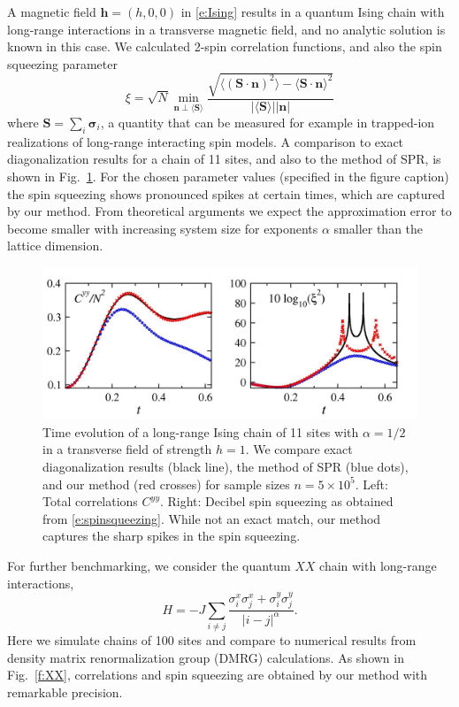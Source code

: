 \documentclass[aps,prl,showpacs,amsmath,amssymb,superscriptaddress,reprint,10pt]{revtex4-1}
\newcommand{\mvec}[1]{\boldsymbol #1}
\begin{document}
A magnetic field $\mvec{h}=(h,0,0)$ in \eqref{e:Ising} results in a quantum Ising chain with long-range interactions in a transverse magnetic field, and no analytic solution is known in this case. We calculated 2-spin correlation functions, and also the spin squeezing parameter
\begin{equation}\label{e:spinsqueezing}
\xi = \sqrt{N}\min_{\mvec{n}\perp\langle\mvec{S}\rangle}\frac{\sqrt{\langle(\mvec{S}\cdot\mvec{n})^2\rangle - \langle\mvec{S}\cdot\mvec{n}\rangle^2}}{|\langle\mvec{S}\rangle||\mvec{n}|}
\end{equation}
where $\mvec{S}=\sum_i \mvec{\sigma}_i$, a quantity that can be measured for example in trapped-ion realizations of long-range interacting spin models. A comparison to exact diagonalization results for a chain of 11 sites, and also to the method of SPR, is shown in Fig.~\ref{f:TFIM}. For the chosen parameter values (specified in the figure caption) the spin squeezing shows pronounced spikes at certain times, which are captured by our method. From theoretical arguments we expect the approximation error to become smaller with increasing system size for exponents $\alpha$ smaller than the lattice dimension. 

\begin{figure}\centering
\includegraphics[width=\linewidth]{./Jz1hx1_Schach_alph05_N11_nt500000.jpg}
\caption{\label{f:TFIM}%
Time evolution of a long-range Ising chain of 11 sites with $\alpha=1/2$ in a transverse field of strength $h=1$. We compare exact diagonalization results (black line), the method of SPR (blue dots), and our method (red crosses) for sample sizes $n=5\times10^5$. Left: Total correlations $C^{yy}$. Right: Decibel spin squeezing as obtained from \eqref{e:spinsqueezing}. While not an exact match, our method captures the sharp spikes in the spin squeezing.
}%
\end{figure}

For further benchmarking, we consider the quantum $XX$ chain with long-range interactions,
\begin{equation}\label{e:XY}
H=-J\sum_{i\neq j}\frac{\sigma_i^x\sigma_j^x+\sigma_i^y\sigma_j^y}{|i-j|^\alpha}.
\end{equation}
Here we simulate chains of 100 sites and compare to numerical results from density matrix renormalization group (DMRG) calculations. As shown in Fig.~\ref{f:XX}, correlations and spin squeezing are obtained by our method with remarkable precision.
\end{document}
